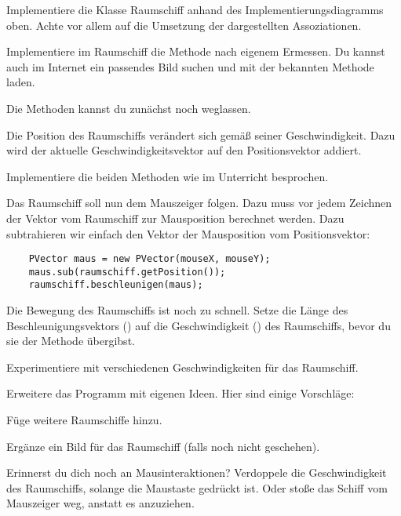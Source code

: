 \documentclass[9pt, a4paper]{arbeitsblatt}
\begin{document}

\begin{aufgabe}
\begin{enuma}
	\item Implementiere die Klasse Raumschiff anhand des Implementierungsdiagramms oben. Achte vor allem auf die Umsetzung der dargestellten Assoziationen.

	Implementiere im Raumschiff die  Methode nach eigenem Ermessen. Du kannst auch im Internet ein passendes Bild suchen und mit der bekannten  Methode laden.

	Die  Methoden kannst du zunächst noch weglassen.
	\item Die Position des Raumschiffs verändert sich gemäß seiner Geschwindigkeit. Dazu wird der aktuelle Geschwindigkeitsvektor auf den Positionsvektor addiert.

	Implementiere die beiden  Methoden wie im Unterricht besprochen.
	\item Das Raumschiff soll nun dem Mauszeiger folgen. Dazu muss vor jedem Zeichnen der Vektor vom Raumschiff zur Mausposition berechnet werden. Dazu subtrahieren wir einfach den Vektor der Mausposition vom Positionsvektor:
	\begin{verbatim}
	PVector maus = new PVector(mouseX, mouseY);
	maus.sub(raumschiff.getPosition());
	raumschiff.beschleunigen(maus);
	\end{verbatim}
	\item Die Bewegung des Raumschiffs ist noch zu schnell. Setze die Länge des Beschleunigungsvektors () auf die Geschwindigkeit () des Raumschiffs, bevor du sie der Methode  übergibst.

	Experimentiere mit verschiedenen Geschwindigkeiten für das Raumschiff.
	\item Erweitere das Programm mit eigenen Ideen. Hier sind einige Vorschläge:
	\begin{smallitem}
		\item Füge weitere Raumschiffe hinzu.
		\item Ergänze ein Bild für das Raumschiff (falls noch nicht geschehen).
		\item Erinnerst du dich noch an Mausinteraktionen? Verdoppele die Geschwindigkeit des Raumschiffs, solange die Maustaste gedrückt ist. Oder stoße das Schiff vom Mauszeiger weg, anstatt es anzuziehen.
	\end{smallitem}
\end{enuma}
\end{aufgabe}
\end{document}
